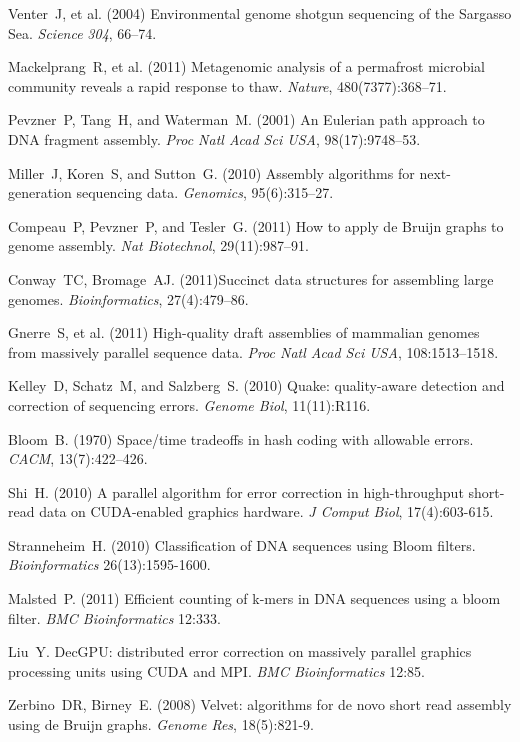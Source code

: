 \documentclass[draft]{pnastwo}
\begin{document}
\begin{article}
\begin{thebibliography}{10}
 Venter~J, et al. (2004) Environmental genome shotgun 
sequencing of the Sargasso Sea. {\it Science} \emph{304}, 66--74.

 Mackelprang~R, et al. (2011) Metagenomic analysis of a 
permafrost microbial community reveals a rapid response to thaw. {\it Nature}, 
480(7377):368--71.

 Pevzner~P, Tang~H, and Waterman~M. (2001) An 
Eulerian path approach to DNA fragment assembly. {\it Proc Natl Acad Sci USA},
 98(17):9748--53.

 Miller~J, Koren~S, and Sutton~G. (2010) Assembly 
algorithms for next-generation sequencing data. {\it Genomics}, 95(6):315--27.

 Compeau~P, Pevzner~P, and Tesler~G. (2011) How to 
apply de {B}ruijn graphs to genome assembly. {\it Nat Biotechnol}, 
29(11):987--91.

 Conway~TC, Bromage~AJ.  (2011)Succinct data structures for
assembling large genomes.  {\it Bioinformatics}, 27(4):479--86.

 Gnerre~S, et al. (2011) High-quality draft assemblies 
of mammalian genomes from massively parallel sequence data. {\it Proc Natl 
Acad Sci USA}, 108:1513--1518.

 Kelley~D, Schatz~M, and Salzberg~S. (2010) Quake: 
quality-aware detection and correction of sequencing errors. {\it Genome 
Biol}, 11(11):R116.

 Bloom~B. (1970) Space/time tradeoffs in hash coding with 
allowable errors. {\it CACM}, 13(7):422--426.

 Shi~H. (2010) A parallel algorithm for error correction 
in high-throughput short-read data on CUDA-enabled graphics hardware. {\it 
J Comput Biol}, 17(4):603-615.

 Stranneheim~H. (2010) Classification of DNA sequences 
using Bloom filters. {\it Bioinformatics} 26(13):1595-1600.

 Malsted~P. (2011) Efficient counting of k-mers in DNA 
sequences using a bloom filter. {\it BMC Bioinformatics} 12:333.

 Liu~Y. DecGPU: distributed error correction on 
massively parallel graphics processing units using CUDA and MPI. {\it 
BMC Bioinformatics} 12:85.

 Zerbino~DR, Birney~E. (2008) Velvet: algorithms for de novo 
short read assembly using de Bruijn graphs. {\it Genome Res}, 18(5):821-9.


\end{thebibliography}
\end{article}
\end{document}
